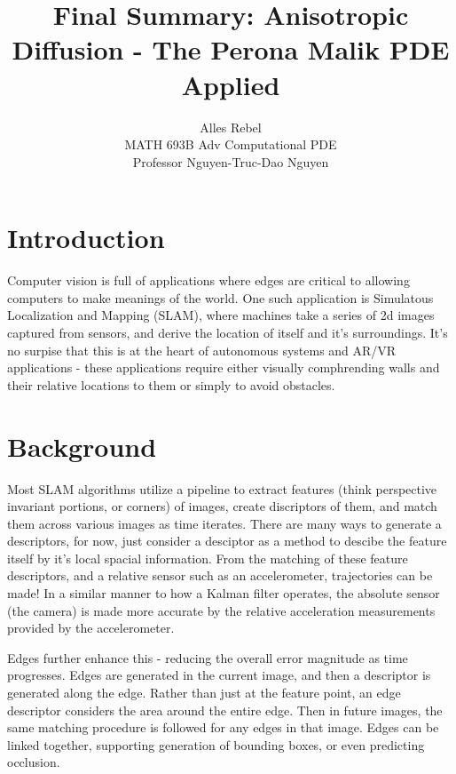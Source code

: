 \documentclass{article}
\title{Final Summary: Anisotropic Diffusion - The Perona Malik PDE Applied}
\author{
	Alles Rebel \\
	MATH 693B Adv Computational PDE \\
	Professor Nguyen-Truc-Dao Nguyen
}
\begin{document}
\maketitle

\section*{Introduction}
Computer vision is full of applications where edges are critical to allowing computers to make meanings of the world. One such application is Simulatous Localization and Mapping (SLAM), where machines take a series of 2d images captured from sensors, and derive the location of itself and it's surroundings. It's no surpise that this is at the heart of autonomous systems and AR/VR applications - these applications require either visually comphrending walls and their relative locations to them or simply to avoid obstacles.

\section*{Background}
Most SLAM algorithms utilize a pipeline to extract features (think perspective invariant portions, or corners) of images, create discriptors of them, and match them across various images as time iterates. There are many ways to generate a descriptors, for now, just consider a desciptor as a method to descibe the feature itself by it's local spacial information. From the matching of these feature descriptors, and a relative sensor such as an accelerometer, trajectories can be made! In a similar manner to how a Kalman filter operates, the absolute sensor (the camera) is made more accurate by the relative acceleration measurements provided by the accelerometer. 

Edges further enhance this - reducing the overall error magnitude as time progresses. Edges are generated in the current image, and then a descriptor is generated along the edge. Rather than just at the feature point, an edge descriptor considers the area around the entire edge. Then in future images, the same matching procedure is followed for any edges in that image. Edges can be linked together, supporting generation of bounding boxes, or even predicting occlusion. 
\end{document}
